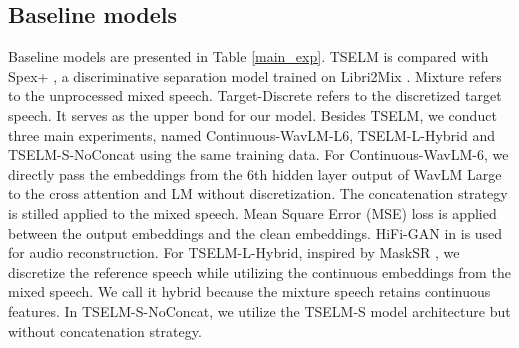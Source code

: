 \documentclass[conference]{IEEEtran}
\begin{document}
\subsection{Baseline models}
Baseline models are presented in Table \ref{main_exp}. 
TSELM is compared with Spex+ \cite{spex_plus}, a discriminative separation model trained on Libri2Mix \cite{librimix}. 
Mixture refers to the unprocessed mixed speech. 
Target-Discrete refers to the discretized target speech. It serves as the upper bond for our model.  Besides TSELM, we conduct three main experiments, named
 Continuous-WavLM-L6, TSELM-L-Hybrid and TSELM-S-NoConcat using the same training data. 
For Continuous-WavLM-6, we directly
pass the embeddings from the 6th hidden layer output of WavLM Large to the cross attention  
and LM without discretization. 
The concatenation strategy is stilled applied to the mixed speech. Mean Square Error (MSE) loss is applied between the output embeddings and the clean 
embeddings. HiFi-GAN in \cite{knn_vc} is used for audio reconstruction. For 
TSELM-L-Hybrid, inspired by MaskSR \cite{mask_sr}, we discretize the reference 
speech while utilizing the continuous embeddings from the mixed speech. We call 
it hybrid because the mixture speech retains continuous features. In TSELM-S-NoConcat, we utilize the TSELM-S model architecture but without concatenation strategy. 
\end{document}
